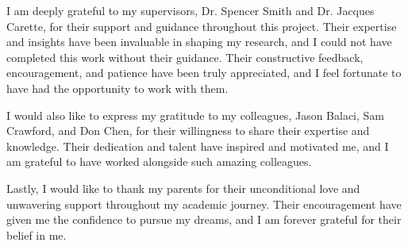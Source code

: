 
I am deeply grateful to my supervisors, Dr. Spencer Smith and Dr. Jacques 
Carette, for their support and guidance throughout this project. Their 
expertise and insights have been invaluable in shaping my research, and I could 
not have completed this work without their guidance. Their constructive 
feedback, encouragement, and patience have been truly appreciated, and I feel 
fortunate to have had the opportunity to work with them.

I would also like to express my gratitude to my colleagues, Jason Balaci, Sam 
Crawford, and Don Chen, for their willingness to share their expertise and 
knowledge. Their dedication and talent have inspired and motivated me, and I am 
grateful to have worked alongside such amazing colleagues.

Lastly, I would like to thank my parents for their unconditional love and 
unwavering support throughout my academic journey. Their encouragement have 
given me the confidence to pursue my dreams, and I am forever grateful for 
their belief in me.